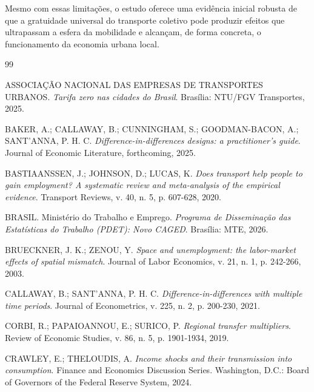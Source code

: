 \documentclass[12pt, a4paper]{article}
\begin{document}
Mesmo com essas limitações, o estudo oferece uma evidência inicial robusta de que a gratuidade universal do transporte coletivo pode produzir efeitos que ultrapassam a esfera da mobilidade e alcançam, de forma concreta, o funcionamento da economia urbana local.

\newpage

\renewcommand{\refname}{\centering{Referências Bibliográficas}}
\begin{thebibliography}{99}

ASSOCIAÇÃO NACIONAL DAS EMPRESAS DE TRANSPORTES URBANOS. \textit{Tarifa zero nas cidades do Brasil}. Brasília: NTU/FGV Transportes, 2025.

BAKER, A.; CALLAWAY, B.; CUNNINGHAM, S.; GOODMAN-BACON, A.; SANT’ANNA, P. H. C. \textit{Difference-in-differences designs: a practitioner’s guide}. Journal of Economic Literature, forthcoming, 2025.

BASTIAANSSEN, J.; JOHNSON, D.; LUCAS, K. \textit{Does transport help people to gain employment? A systematic review and meta-analysis of the empirical evidence}. Transport Reviews, v. 40, n. 5, p. 607-628, 2020.

BRASIL. Ministério do Trabalho e Emprego. \textit{Programa de Disseminação das Estatísticas do Trabalho (PDET): Novo CAGED}. Brasília: MTE, 2026.

BRUECKNER, J. K.; ZENOU, Y. \textit{Space and unemployment: the labor-market effects of spatial mismatch}. Journal of Labor Economics, v. 21, n. 1, p. 242-266, 2003.

CALLAWAY, B.; SANT’ANNA, P. H. C. \textit{Difference-in-differences with multiple time periods}. Journal of Econometrics, v. 225, n. 2, p. 200-230, 2021.

CORBI, R.; PAPAIOANNOU, E.; SURICO, P. \textit{Regional transfer multipliers}. Review of Economic Studies, v. 86, n. 5, p. 1901-1934, 2019.

CRAWLEY, E.; THELOUDIS, A. \textit{Income shocks and their transmission into consumption}. Finance and Economics Discussion Series. Washington, D.C.: Board of Governors of the Federal Reserve System, 2024.


\end{thebibliography}
\end{document}
